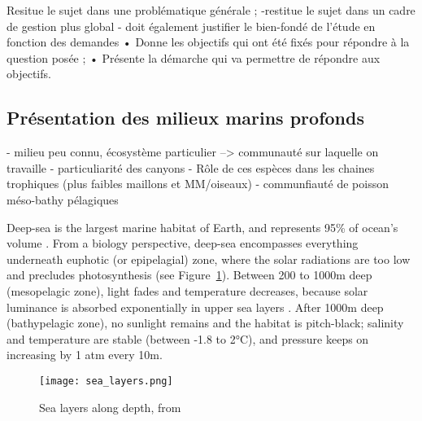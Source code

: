 

Resitue le sujet dans une problématique générale ;
 -restitue le sujet dans un cadre de gestion plus global
- doit également justifier le bien-fondé de l’étude en fonction des demandes
• Donne les objectifs qui ont été fixés pour répondre à la question posée ;
• Présente la démarche qui va permettre de répondre aux objectifs.


\subsection{Présentation des milieux marins profonds}
- milieu peu connu, écosystème particulier --> communauté sur laquelle on travaille 
- particuliarité des canyons 
- Rôle de ces espèces dans les chaines trophiques (plus faibles maillons et MM/oiseaux)
- communfiauté de poisson méso-bathy pélagiques 


Deep-sea is the largest marine habitat of Earth, and represents 95\% of ocean's volume \citep{danovaro2017,salazar2016}. From a biology perspective, deep-sea encompasses everything underneath euphotic (or epipelagial) zone, where the solar radiations are too low and precludes photosynthesis \citep{baker2020,danovaro2017,salazar2016} (see Figure~\ref{fig:dsl}). Between 200 to 1000m deep (mesopelagic zone), light fades and temperature decreases, because solar luminance is absorbed exponentially in upper sea layers \citep{reynolds2001}. After 1000m deep (bathypelagic zone), no sunlight remains and the habitat is pitch-black; salinity and temperature are stable (between -1.8 to 2°C), and pressure keeps on increasing by 1 atm every 10m. 

\begin{figure} [!htbp]
	\begin{center}
		\texttt{[image: sea\_layers.png]}
	\end{center}
	\caption[Petite légende]{Sea layers along depth, from \citep{fig_deep_sea}}
	\label{fig:dsl}
\end{figure}

